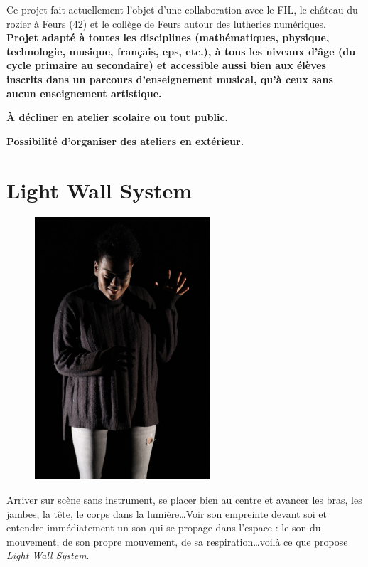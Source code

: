 \documentclass[fontsize=12pt]{scrartcl} %
\numberwithin{equation}{section} %
\numberwithin{table}{section} %
\begin{document}
Ce projet fait actuellement l'objet d'une collaboration avec le FIL, le château du rozier à Feurs (42) et le collège de Feurs autour des lutheries numériques.\\

\noindent
\textbf{Projet adapté à toutes les disciplines (mathématiques, physique, technologie, musique, français, eps, etc.), à tous les niveaux d'âge (du cycle primaire au secondaire) et accessible aussi bien aux élèves inscrits dans un parcours d'enseignement musical, qu'à ceux sans aucun enseignement artistique.}

\noindent 
\textbf{À décliner en atelier scolaire ou tout public.}
 
\noindent 
\textbf{Possibilité d'organiser des ateliers en extérieur.}

\pagebreak

\section{Light Wall System}
\label{app:lightwall}

\begin{figure}
\centering
\includegraphics[width=6.5cm]{img/lightwall}
\label{fig:lightwall}
\end{figure}

Arriver sur scène sans instrument, se placer bien au centre et avancer les bras, les jambes, la tête, le corps dans la lumière\dots Voir son empreinte devant soi et entendre immédiatement un son qui se propage dans l'espace : le son du mouvement, de son propre mouvement, de sa respiration\dots voilà ce que propose \textit{Light Wall System}.
\end{document}
